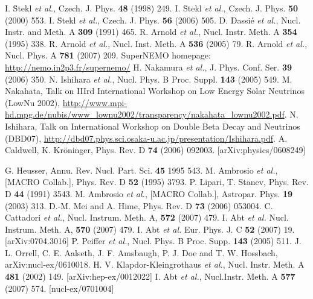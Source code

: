 \begin{thebibliography}{99}
I. \u{S}tekl \textit{et al.}, Czech. J. Phys. \textbf{48} (1998) 249.
I. \u{S}tekl \textit{et al.}, Czech. J. Phys. \textbf{50} (2000) 553.
I. \u{S}tekl \textit{et al.}, Czech. J. Phys. \textbf{56} (2006) 505.
D. Dassi\'{e} \textit{et al.}, Nucl. Instr. and Meth. A \textbf{309} (1991) 465.
R. Arnold \textit{et al.}, Nucl. Instr. Meth. A \textbf{354} (1995) 338.
R. Arnold \textit{et al.}, Nucl. Inst. Meth. A \textbf{536} (2005) 79.
R. Arnold \textit{et al.}, Nucl. Phys. A \textbf{781} (2007) 209.
SuperNEMO homepage: \url{http://nemo.in2p3.fr/supernemo/}
H. Nakamura \textit{et al.}, J. Phys. Conf. Ser. \textbf{39} (2006) 350.
N. Ishihara \textit{et al.}, Nucl. Phys. B Proc. Suppl. \textbf{143} (2005) 549.
M. Nakahata, Talk on IIIrd International Workshop on Low Energy Solar Neutrinos (LowNu 2002), \url{http://www.mpi-hd.mpg.de/nubis/www\_lownu2002/transparency/nakahata\_lownu2002.pdf}. 
N. Ishihara, Talk on International Workshop on Double Beta Decay and Neutrinos (DBD07), \url{http://dbd07.phys.sci.osaka-u.ac.jp/presentation/Ishihara.pdf}.
A. Caldwell, K. Kr\"oninger, Phys. Rev. D \textbf{74}
(2006) 092003. [arXiv:physics/0608249]

 G. Heusser, Annu. Rev. Nucl. Part. Sci. \textbf{45} 1995 543.
 M. Ambrosio \textit{et al.}, [MACRO Collab.], Phys. Rev. D \textbf{52} (1995) 3793.
 P. Lipari, T. Stanev, Phys. Rev. D \textbf{44} (1991) 3543.
 M. Ambrosio \textit{et al.}, [MACRO Collab.], Astropar. Phys. \textbf{19} (2003) 313.
 D.-M. Mei and A. Hime, Phys. Rev. D \textbf{73} (2006) 053004.
 C. Cattadori \textit{et al.}, Nucl. Instrum. Meth. A, \textbf{572} (2007) 479.
 I. Abt \textit{et al.} Nucl. Instrum. Meth. A, \textbf{570} (2007) 479.
 I. Abt \textit{et al.}  Eur. Phys. J. C \textbf{52}   (2007) 19. [arXiv:0704.3016]
 P. Peiffer \textit{et al.}, Nucl. Phys. B   Proc. Supp. \textbf{143} (2005) 511.
 J. L. Orrell, C. E. Aalseth, J. F. Amsbaugh, P. J. Doe   and T. W. Hossbach, arXiv:nucl-ex/0610018.
 H. V. Klapdor-Kleingrothaus \textit{et al.},   Nucl. Instr. Meth. A \textbf{481} (2002) 149. [arXiv:hep-ex/0012022]
 I. Abt \textit{et al.}, Nucl.Instr. Meth. A \textbf{577} (2007) 574. [nucl-ex/0701004]


\end{thebibliography}
